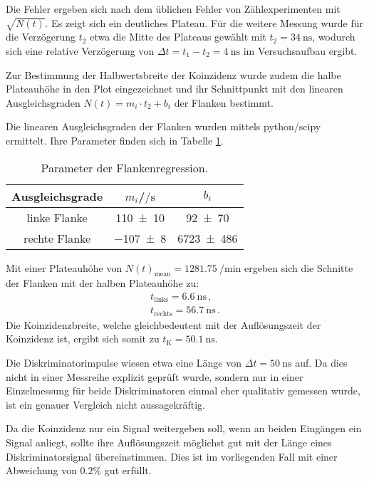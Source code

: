 Die Fehler ergeben sich nach dem üblichen Fehler von Zählexperimenten mit $\sqrt{N(t)}$. Es zeigt sich ein deutliches Plateau.
Für die weitere Messung wurde für die Verzögerung $t_2$ etwa die Mitte des Plateaus gewählt mit $t_2=\SI{34}{\nano\second}$, wodurch sich eine relative Verzögerung von $\Delta t=t_1-t_2=\SI{4}{\nano\second}$ im Versuchsaufbau ergibt.

Zur Bestimmung der Halbwertsbreite der Koinzidenz wurde zudem die halbe Plateauhöhe in den Plot eingezeichnet und ihr Schnittpunkt mit den linearen Ausgleichsgraden $N(t)=m_i\cdot t_2+b_i$ der Flanken bestimmt.

Die linearen Ausgleichsgraden der Flanken wurden mittels python/scipy\cite{scipy} ermittelt. Ihre Parameter finden sich in Tabelle \ref{tab:plateau2}.
\begin{table}

	\caption{Parameter der Flankenregression.}
  \label{tab:plateau2}
  \centering

	\begin{tabular}{ccc}
\toprule
		Ausgleichsgrade&$m_i$/$\si{\per\second}$&$b_i$\\
\midrule
		linke Flanke&\num{110(10)}&\num{92(70)}\\
		rechte Flanke&\num{-107(8)}&\num{6723(486)}\\
		\bottomrule
	\end{tabular}
\end{table}
Mit einer Plateauhöhe von $N(t)_{\mathrm{mean}}=\SI{1281.75}{\per\minute}$ ergeben sich die Schnitte der Flanken mit der halben Plateauhöhe zu:
\begin{align*}
t_{\mathrm{links}}=\SI{6.6}{\nano\second}\,\text{,}\\
t_{\mathrm{rechts}}=\SI{56.7}{\nano\second}\,\text{.}
\end{align*}
Die Koinzidenzbreite, welche gleichbedeutent mit der Auflösungszeit der Koinzidenz ist, ergibt sich somit zu $t_{\text{K}}=\SI{50.1}{\nano\second}$.

Die Diskriminatorimpulse wiesen etwa eine Länge von $\Delta t=\SI{50}{\nano\second}$ auf. Da dies nicht in einer Messreihe explizit geprüft wurde, sondern nur in einer Einzelmessung für beide Diskriminatoren einmal eher qualitativ gemessen wurde, ist ein genauer Vergleich nicht aussagekräftig.

Da die Koinzidenz nur ein Signal weitergeben soll, wenn an beiden Eingängen ein Signal anliegt, sollte ihre Auflösungszeit möglichst gut mit der Länge eines Diskriminatorsignal übereinstimmen. Dies ist im vorliegenden Fall mit einer Abweichung von $0.2\%$ gut erfüllt.

